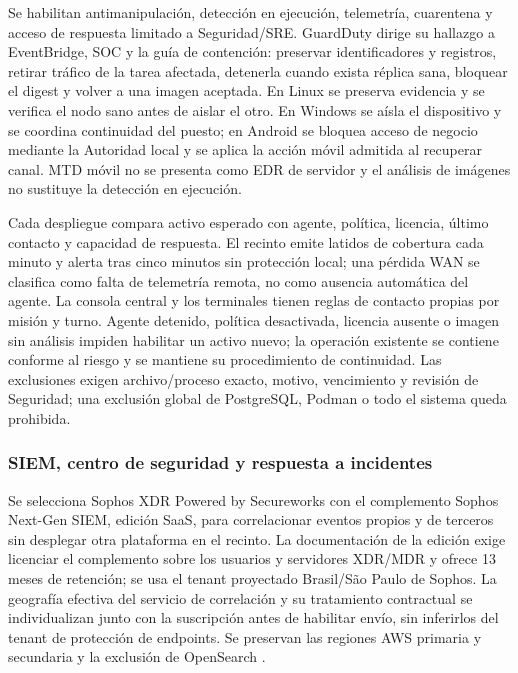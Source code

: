 Se habilitan antimanipulación, detección en ejecución, telemetría, cuarentena y acceso de respuesta limitado a Seguridad/SRE. GuardDuty dirige su hallazgo a EventBridge, SOC y la guía de contención: preservar identificadores y registros, retirar tráfico de la tarea afectada, detenerla cuando exista réplica sana, bloquear el digest y volver a una imagen aceptada. En Linux se preserva evidencia y se verifica el nodo sano antes de aislar el otro. En Windows se aísla el dispositivo y se coordina continuidad del puesto; en Android se bloquea acceso de negocio mediante la Autoridad local y se aplica la acción móvil admitida al recuperar canal. MTD móvil no se presenta como EDR de servidor y el análisis de imágenes no sustituye la detección en ejecución.

Cada despliegue compara activo esperado con agente, política, licencia, último contacto y capacidad de respuesta. El recinto emite latidos de cobertura cada minuto y alerta tras cinco minutos sin protección local; una pérdida WAN se clasifica como falta de telemetría remota, no como ausencia automática del agente. La consola central y los terminales tienen reglas de contacto propias por misión y turno. Agente detenido, política desactivada, licencia ausente o imagen sin análisis impiden habilitar un activo nuevo; la operación existente se contiene conforme al riesgo y se mantiene su procedimiento de continuidad. Las exclusiones exigen archivo/proceso exacto, motivo, vencimiento y revisión de Seguridad; una exclusión global de PostgreSQL, Podman o todo el sistema queda prohibida.

\subsubsection{SIEM, centro de seguridad y respuesta a incidentes}
\label{sec:4-siem-incidentes-rt}

Se selecciona Sophos XDR Powered by Secureworks con el complemento Sophos Next-Gen SIEM, edición SaaS, para correlacionar eventos propios y de terceros sin desplegar otra plataforma en el recinto. La documentación de la edición exige licenciar el complemento sobre los usuarios y servidores XDR/MDR y ofrece 13 meses de retención; se usa el tenant proyectado Brasil/São Paulo de Sophos. La geografía efectiva del servicio de correlación y su tratamiento contractual se individualizan junto con la suscripción antes de habilitar envío, sin inferirlos del tenant de protección de endpoints. Se preservan las regiones AWS primaria y secundaria y la exclusión de OpenSearch \parencites{sec-sophos-siem,sec-sophos-tenant}.

